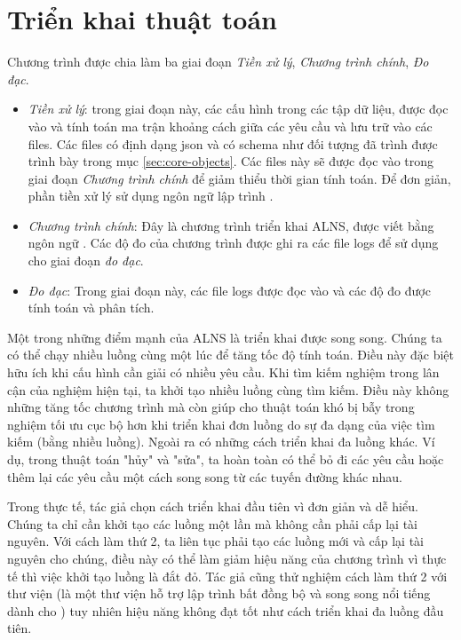 \section{Triển khai thuật toán}
Chương trình được chia làm ba giai đoạn \textit{Tiền xử lý}, \textit{Chương trình chính}, \textit{Đo đạc}.
\begin{itemize}
	\item \textit{Tiền xử lý}: trong giai đoạn này, các cấu hình trong các tập dữ liệu, được đọc vào và tính toán ma trận khoảng cách giữa các yêu cầu và lưu trữ vào các files. Các files có định dạng json và có schema như đối tượng  đã trình được trình bày trong mục \ref{sec:core-objects}. Các files này sẽ được đọc vào trong giai đoạn \textit{Chương trình chính} để giảm thiểu thời gian tính toán. Để đơn giản, phần tiền xử lý sử dụng ngôn ngữ lập trình .
	\item \textit{Chương trình chính}: Đây là chương trình triển khai ALNS, được viết bằng ngôn ngữ . Các độ đo của chương trình được ghi ra các file logs để sử dụng cho giai đoạn \textit{đo đạc}.
	\item \textit{Đo đạc}: Trong giai đoạn này, các file logs được đọc vào và các độ đo được tính toán và phân tích.
\end{itemize}

Một trong những điểm mạnh của ALNS là triển khai được song song. Chúng ta có thể chạy nhiều luồng cùng một lúc để tăng tốc độ tính toán. Điều này đặc biệt hữu ích khi cấu hình cần giải có nhiều yêu cầu. Khi tìm kiếm nghiệm trong lân cận của nghiệm hiện tại, ta khởi tạo nhiều luồng cùng tìm kiếm. Điều này không những tăng tốc chương trình mà còn giúp cho thuật toán khó bị bẫy trong nghiệm tối ưu cục bộ hơn khi triển khai đơn luồng do sự đa dạng của việc tìm kiếm (bằng nhiều luồng). Ngoài ra có những cách triển khai đa luồng khác. Ví dụ, trong thuật toán "hủy" và "sửa", ta hoàn toàn có thể bỏ đi các yêu cầu hoặc thêm lại các yêu cầu một cách song song từ các tuyến đường khác nhau.

Trong thực tế, tác giả chọn cách triển khai đầu tiên vì đơn giản và dễ hiểu. Chúng ta chỉ cần khởi tạo các luồng một lần mà không cần phải cấp lại tài nguyên. Với cách làm thứ 2, ta liên tục phải tạo các luồng mới và cấp lại tài nguyên cho chúng, điều này có thể làm giảm hiệu năng của chương trình vì thực tế thì việc khởi tạo luồng là đắt đỏ. Tác giả cũng thử nghiệm cách làm thứ 2 với thư viện  (là một thư viện hỗ trợ lập trình bất đồng bộ và song song nổi tiếng dành cho ) tuy nhiên hiệu năng không đạt tốt như cách triển khai đa luồng đầu tiên.
